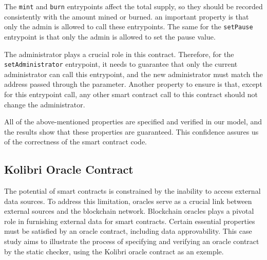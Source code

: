 \documentclass[a4paper,UKenglish,cleveref, autoref, thm-restate]{lipics-v2021}
\begin{document}
The \lstinline/mint/ and \lstinline/burn/ entrypoints affect the total supply, so they should be recorded consistently with the amount mined or burned. an important property is that only the admin is allowed to call these entrypoints. The same for the \lstinline/setPause/ entrypoint is that only the admin is allowed to set the pause value.

The administrator plays a crucial role in this contract. Therefore, for the \lstinline/setAdministrator/ entrypoint, it needs to guarantee that only the current administrator can call this entrypoint, and the new administrator must match the address passed through the parameter. Another property to ensure is that, except for this entrypoint call, any other smart contract call to this contract should not change the administrator.

All of the above-mentioned properties are specified and verified in our model, and the results show that these properties are guaranteed. This confidence assures us of the correctness of the smart contract code.
\subsection{Kolibri Oracle Contract}
The potential of smart contracts is constrained by the inability to access external data sources. To address this limitation, oracles serve as a crucial link between external sources and the blockchain network.  Blockchain oracles plays a pivotal role in furnishing external data for smart contracts. Certain essential properties must be satisfied by an oracle contract, including data approvability. This case study aims to illustrate the process of specifying and verifying an oracle contract by the static checker, using the Kolibri oracle contract as an exemple.
\end{document}
